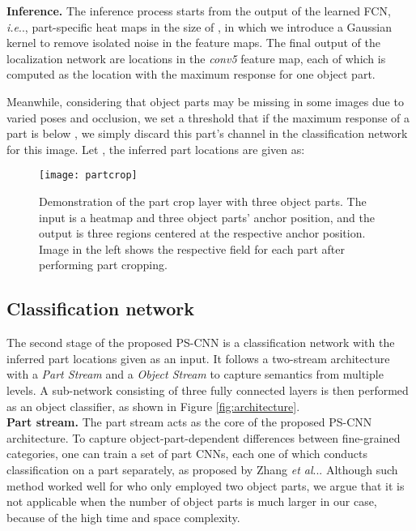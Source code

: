 \documentclass[10pt,twocolumn,letterpaper]{article}
\makeatletter
\DeclareRobustCommand\onedot{\futurelet\@let@token\@onedot}
\def\@onedot{\ifx\@let@token.\else.\null\fi\xspace}
\def\ie{\emph{i.e}\onedot} \def\Ie{\emph{I.e}\onedot}
\def\etal{\emph{et al}\onedot}
\makeatother
\begin{document}
\noindent\textbf{Inference.} The inference process starts from the output of the learned FCN, \ie,  part-specific heat maps in the size of , in which we introduce a Gaussian kernel  to remove isolated noise in the feature maps. The final output of the localization network are  locations in the  \textit{conv5} feature map, each of which is computed as the location with the maximum response for one object part. 

Meanwhile, considering that object parts may be missing in some images due to varied poses and occlusion, we set a threshold  that if the maximum response of a part is below , we simply discard this part's channel in the classification network for this image. Let , the inferred part locations are given as:



\begin{figure}[t]
\begin{center}
\texttt{[image: partcrop]}
\end{center}
   \caption{Demonstration of the part crop layer with three object parts. The input is a  heatmap and three object parts' anchor position, and the output is three  regions centered at the respective anchor position. Image in the left shows the respective field for each part after performing part cropping.}
\label{fig:partcrop}
\end{figure}

\subsection{Classification network}\label{subsec:classification}
The second stage of the proposed PS-CNN is a classification network with the inferred part locations given as an input. It follows a two-stream architecture with a \emph{Part Stream} and a \emph{Object Stream} to capture semantics from multiple levels. A sub-network consisting of three fully connected layers is then performed as an object classifier, as shown in Figure \ref{fig:architecture}. \\

\noindent\textbf{Part stream.}
The part stream acts as the core of the proposed PS-CNN architecture. To capture object-part-dependent differences between fine-grained categories, one can train a set of part CNNs, each one of which conducts classification on a part separately, as proposed by Zhang \etal \cite{zhang2014part}. Although such method worked well for \cite{zhang2014part} who only employed two object parts, we argue that it is not applicable when the number of object parts is much larger in our case, because of the high time and space complexity.
\end{document}
